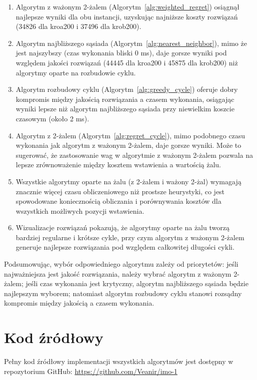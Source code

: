 \documentclass[12pt,a4paper]{article}
\begin{document}
\begin{enumerate}
    \item Algorytm z ważonym 2-żalem (Algorytm~\ref{alg:weighted_regret}) osiągnął najlepsze wyniki dla obu instancji, uzyskując najniższe koszty rozwiązań (34826 dla kroa200 i 37496 dla krob200).
    
    \item Algorytm najbliższego sąsiada (Algorytm~\ref{alg:nearest_neighbor}), mimo że jest najszybszy (czas wykonania bliski 0 ms), daje gorsze wyniki pod względem jakości rozwiązań (44445 dla kroa200 i 45875 dla krob200) niż algorytmy oparte na rozbudowie cyklu.
    
    \item Algorytm rozbudowy cyklu (Algorytm~\ref{alg:greedy_cycle}) oferuje dobry kompromis między jakością rozwiązania a czasem wykonania, osiągając wyniki lepsze niż algorytm najbliższego sąsiada przy niewielkim koszcie czasowym (około 2 ms).
    
    \item Algorytm z 2-żalem (Algorytm~\ref{alg:regret_cycle}), mimo podobnego czasu wykonania jak algorytm z ważonym 2-żalem, daje gorsze wyniki. Może to sugerować, że zastosowanie wag w algorytmie z ważonym 2-żalem pozwala na lepsze zrównoważenie między kosztem wstawienia a wartością żalu.
    
    \item Wszystkie algorytmy oparte na żalu (z 2-żalem i ważony 2-żal) wymagają znacznie więcej czasu obliczeniowego niż prostsze heurystyki, co jest spowodowane koniecznością obliczania i porównywania kosztów dla wszystkich możliwych pozycji wstawienia.
    
    \item Wizualizacje rozwiązań pokazują, że algorytmy oparte na żalu tworzą bardziej regularne i krótsze cykle, przy czym algorytm z ważonym 2-żalem generuje najlepsze rozwiązania pod względem całkowitej długości cykli.
\end{enumerate}

Podsumowując, wybór odpowiedniego algorytmu zależy od priorytetów: jeśli najważniejsza jest jakość rozwiązania, należy wybrać algorytm z ważonym 2-żalem; jeśli czas wykonania jest krytyczny, algorytm najbliższego sąsiada będzie najlepszym wyborem; natomiast algorytm rozbudowy cyklu stanowi rozsądny kompromis między jakością a czasem wykonania.

\section{Kod źródłowy}
Pełny kod źródłowy implementacji wszystkich algorytmów jest dostępny w repozytorium GitHub:
\url{https://github.com/Veanir/imo-1}
\end{document}
